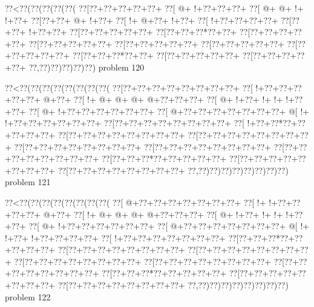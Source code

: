 \vbox{\vbox{\goo
\0??<\0??(\0??(\0??(\0??(\0??(
\0??[\0??+\0??+\0??+\0??+\0??+
\0??[\- @+\- !+\0??+\0??+\0??+
\0??[\- @+\- @+\- !+\- !+\0??+
\0??[\0??+\0??+\- @+\- !+\0??+
\0??[\- !+\- @+\0??+\- !+\0??+
\0??[\- !+\0??+\0??+\0??+\0??+
\0??[\0??+\0??+\- !+\0??+\0??+
\0??[\0??+\0??+\0??+\0??+\0??+
\0??[\0??+\0??+\0??*\0??+\0??+
\0??[\0??+\0??+\0??+\0??+\0??+
\0??[\0??+\0??+\0??+\0??+\0??+
\0??[\0??+\0??+\0??+\0??+\0??+
\0??[\0??+\0??+\0??+\0??+\0??+
\0??[\0??+\0??+\0??+\0??+\0??+
\0??[\0??+\0??+\0??*\0??+\0??+
\0??[\0??+\0??+\0??+\0??+\0??+
\0??[\0??+\0??+\0??+\0??+\0??+
\0??,\0??)\0??)\0??)\0??)\0??)
}
\hfil problem 120\hfil\break
}

\vbox{\vbox{\goo
\0??<\0??(\0??(\0??(\0??(\0??(\0??(\0??(\0??(
\0??[\0??+\0??+\0??+\0??+\0??+\0??+\0??+\0??+
\0??[\- !+\0??+\0??+\0??+\0??+\0??+\- @+\0??+
\0??[\- !+\- @+\- @+\- @+\- @+\0??+\0??+\0??+
\0??[\- @+\- !+\0??+\- !+\- !+\- !+\0??+\0??+
\0??[\- @+\- !+\0??+\0??+\0??+\0??+\0??+\0??+
\0??[\- @+\0??+\0??+\0??+\0??+\0??+\0??+\0??+
\- @[\- !+\- !+\0??+\0??+\0??+\0??+\0??+\0??+
\0??[\0??+\0??+\0??+\0??+\0??+\0??+\0??+\0??+
\0??[\- !+\0??+\0??*\0??+\0??+\0??+\0??+\0??+
\0??[\0??+\0??+\0??+\0??+\0??+\0??+\0??+\0??+
\0??[\0??+\0??+\0??+\0??+\0??+\0??+\0??+\0??+
\0??[\0??+\0??+\0??+\0??+\0??+\0??+\0??+\0??+
\0??[\0??+\0??+\0??+\0??+\0??+\0??+\0??+\0??+
\0??[\0??+\0??+\0??+\0??+\0??+\0??+\0??+\0??+
\0??[\0??+\0??+\0??*\0??+\0??+\0??+\0??+\0??+
\0??[\0??+\0??+\0??+\0??+\0??+\0??+\0??+\0??+
\0??[\0??+\0??+\0??+\0??+\0??+\0??+\0??+\0??+
\0??,\0??)\0??)\0??)\0??)\0??)\0??)\0??)\0??)
}
\hfil problem 121\hfil\break
}

\vbox{\vbox{\goo
\0??<\0??(\0??(\0??(\0??(\0??(\0??(\0??(\0??(
\0??[\- @+\0??+\0??+\0??+\0??+\0??+\0??+\0??+
\0??[\- !+\- !+\0??+\0??+\0??+\0??+\- @+\0??+
\0??[\- !+\- @+\- @+\- @+\- @+\0??+\0??+\0??+
\0??[\- @+\- !+\0??+\- !+\- !+\- !+\0??+\0??+
\0??[\- @+\- !+\0??+\0??+\0??+\0??+\0??+\0??+
\0??[\- @+\0??+\0??+\0??+\0??+\0??+\0??+\0??+
\- @[\- !+\- !+\0??+\- !+\0??+\0??+\0??+\0??+
\0??[\- !+\0??+\0??+\0??+\0??+\0??+\0??+\0??+
\0??[\0??+\0??+\0??*\0??+\0??+\0??+\0??+\0??+
\0??[\0??+\0??+\0??+\0??+\0??+\0??+\0??+\0??+
\0??[\0??+\0??+\0??+\0??+\0??+\0??+\0??+\0??+
\0??[\0??+\0??+\0??+\0??+\0??+\0??+\0??+\0??+
\0??[\0??+\0??+\0??+\0??+\0??+\0??+\0??+\0??+
\0??[\0??+\0??+\0??+\0??+\0??+\0??+\0??+\0??+
\0??[\0??+\0??+\0??*\0??+\0??+\0??+\0??+\0??+
\0??[\0??+\0??+\0??+\0??+\0??+\0??+\0??+\0??+
\0??[\0??+\0??+\0??+\0??+\0??+\0??+\0??+\0??+
\0??,\0??)\0??)\0??)\0??)\0??)\0??)\0??)\0??)
}
\hfil problem 122\hfil\break
}

